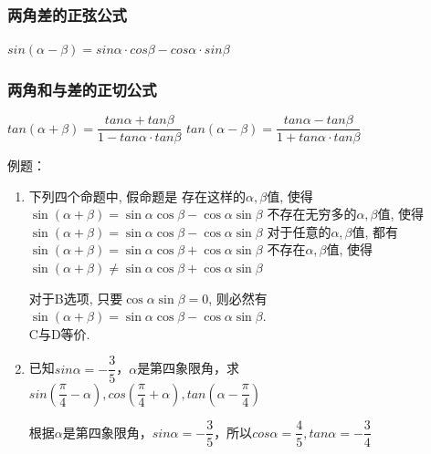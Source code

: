 \subsubsection*{两角差的正弦公式} $sin(\alpha-\beta) = sin\alpha \cdot cos\beta - cos\alpha  \cdot sin\beta$
\subsubsection*{两角和与差的正切公式} $tan(\alpha+\beta) = \dfrac{tan\alpha + tan\beta}{1 - tan\alpha \cdot tan\beta}$ \quad $tan(\alpha-\beta) = \dfrac{tan\alpha - tan\beta}{1 + tan\alpha \cdot tan\beta}$

例题：
\begin{enumerate}
    \item 下列四个命题中, 假命题是
    \xx
    {存在这样的$\alpha,\beta$值, 使得$\sin\left(\alpha+\beta\right)=\sin\alpha\cos\beta-\cos\alpha\sin\beta$}
    {不存在无穷多的$\alpha,\beta$值, 使得$\sin\left(\alpha+\beta\right)=\sin\alpha\cos\beta-\cos\alpha\sin\beta$}
    {对于任意的$\alpha,\beta$值, 都有$\sin\left(\alpha+\beta\right)=\sin\alpha\cos\beta+\cos\alpha\sin\beta$}
    {不存在$\alpha,\beta$值, 使得$\sin\left(\alpha+\beta\right)\neq\sin\alpha\cos\beta+\cos\alpha\sin\beta$}
    \begin{jieda}
    对于B选项, 只要$\cos\alpha\sin\beta=0$, 则必然有$\sin\left(\alpha+\beta\right)=\sin\alpha\cos\beta-\cos\alpha\sin\beta$. \\
    C与D等价. 
    \end{jieda}
    \item 已知$sin\alpha = -\dfrac{3}{5}$，$\alpha$是第四象限角，求$sin\left(\dfrac{\pi}{4} - \alpha\right), cos\left(\dfrac{\pi}{4}+\alpha\right), tan\left(\alpha - \dfrac{\pi}{4}\right)$
    \begin{jieda}
        根据$\alpha$是第四象限角，$sin\alpha = -\dfrac{3}{5}$，所以$cos\alpha = \dfrac{4}{5}, tan\alpha = -\dfrac{3}{4}$
\end{jieda}
\end{enumerate}
